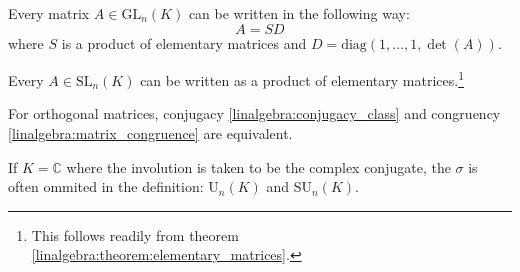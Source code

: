         \begin{theorem}\label{linalgebra:theorem:elementary_matrices}
		Every matrix $A\in\text{GL}_n(K)$ can be written in the following way: \[A = SD\] where $S$ is a product of elementary matrices and $D=\text{diag}(1,\dotso,1,\det(A))$.
	\end{theorem}
        
        \begin{theorem}
		Every $A\in\text{SL}_n(K)$ can be written as a product of elementary matrices.\footnote{This follows readily from theorem \ref{linalgebra:theorem:elementary_matrices}.}
	\end{theorem}
        
        \begin{property}\label{linalgebra:con_equivalence}
        	For orthogonal matrices, conjugacy \ref{linalgebra:conjugacy_class} and congruency \ref{linalgebra:matrix_congruence} are equivalent.
        \end{property}
        

	\begin{remark*}
		If $K=\mathbb{C}$ where the involution is taken to be the complex conjugate, the $\sigma$ is often ommited in the definition: U$_n(K)$ and SU$_n(K)$.
	\end{remark*}
	
